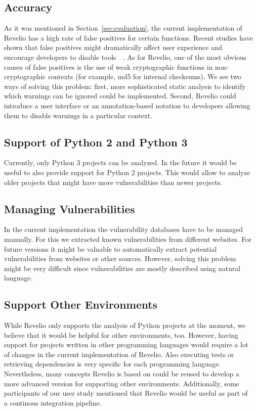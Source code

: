 \subsection{Accuracy}
As it was mentioned in Section~\ref{sec:evaluation}, the current implementation of Revelio has a high rate of false positives for certain functions. Recent studies have shown that false positives might dramatically affect user experience and encourage developers to disable tools~\cite{park2016battles}~\cite{muske2015efficient}. As for Revelio, one of the most obvious causes of false positives is the use of weak cryptographic functions in non-cryptographic contexts (for example, md5 for internal checksums). We see two ways of solving this problem: first, more sophisticated static analysis to identify which warnings can be ignored could be implemented. Second, Revelio could introduce a user interface or an annotation-based notation to developers allowing them to disable warnings in a particular context.

\subsection{Support of Python 2 and Python 3}

Currently, only Python 3 projects can be analyzed. In the future it would be useful to also provide support for Python 2 projects. This would allow to analyze older projects that might have more vulnerabilities than newer projects.

\subsection{Managing Vulnerabilities}
In the current implementation the vulnerability databases have to be managed manually. For this we extracted known vulnerabilities from different websites. For future versions it might be valuable to automatically extract potential vulnerabilities from websites or other sources. However, solving this problem might be very difficult since vulnerabilities are mostly described using natural language. 

\subsection{Support Other Environments}

While Revelio only supports the analysis of Python projects at the moment, we believe that it would be helpful for other environments, too. However, having support for projects written in other programming languages would require a lot of changes in the current implementation of Revelio. Also executing tests or retrieving dependencies is very specific for each programming language. Nevertheless, many concepts Revelio is based on could be reused to develop a more advanced version for supporting other environments.
Additionally, some participants of our user study mentioned that Revelio would be useful as part of a continous integration pipeline.


